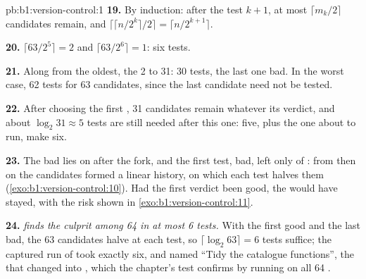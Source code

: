 \begin{solution}{pb:b1:version-control:1}
\textbf{19.} By induction: after the test $k + 1$, at most $\lceil m_k / 2 \rceil$ candidates remain, and
$\lceil \lceil n / 2^k \rceil / 2 \rceil = \lceil n / 2^{k + 1} \rceil$.

\textbf{20.} $\lceil 63 / 2^5 \rceil = 2$ and $\lceil 63 / 2^6 \rceil = 1$: six tests.

\textbf{21.} Along  from the oldest, the  2 to 31: 30 tests, the last one bad. In the worst case, 62
tests for 63 candidates, since the last candidate need not be tested.

\textbf{22.} After choosing the first , 31 candidates remain whatever its verdict, and about $\log_2 31 \approx 5$
tests are still needed after this one: five, plus the one about to run, make six.

\textbf{23.} The bad  lies on  after the fork, and the first test, bad, left only  of :
from then on the candidates formed a linear history, on which each test halves them (\cref{exo:b1:version-control:10}).
Had the first verdict been good, the  would have stayed, with the risk shown in \cref{exo:b1:version-control:11}.

\textbf{24.} \emph{ finds the culprit among 64  in at most 6 tests.} With the first  good and the
last bad, the 63 candidates halve at each test, so $\lceil \log_2 63 \rceil = 6$ tests suffice; the captured run of
 took exactly six, and named ``Tidy the catalogue functions'', the  that changed 
into , which the chapter's test confirms by running  on all 64 .
\end{solution}
